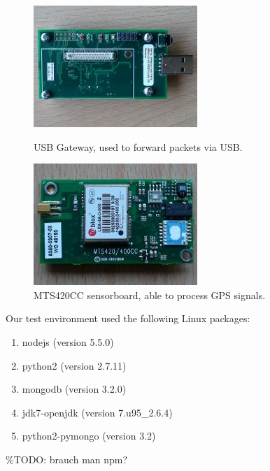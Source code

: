 \documentclass[a4paper]{article}
\begin{document}
\begin{figure}[h!]

\begin{center}
\begin{minipage}{0.47\textwidth}
\begin{center}
\includegraphics[scale=0.5]{pics/gateway.jpg}
\caption{USB Gateway, used to forward packets via USB.}
\label{fig:gateway}
\end{center}
\end{minipage}
\begin{minipage}{0.06\textwidth}
\end{minipage}
\begin{minipage}{0.47\textwidth}
\begin{center}
\includegraphics[scale=0.5]{pics/420cc.jpg}
\caption{MTS420CC sensorboard, able to process GPS signals.}
\label{fig:420cc}
\end{center}
\end{minipage}

\end{center}

\end{figure}

Our test environment used the following Linux packages:
\begin{enumerate}
\item nodejs (version 5.5.0)
\item python2 (version 2.7.11)
\item mongodb (version 3.2.0)
\item jdk7-openjdk (version 7.u95\_2.6.4)
\item python2-pymongo (version 3.2)

\end{enumerate}
\%TODO: brauch man npm?
\end{document}
